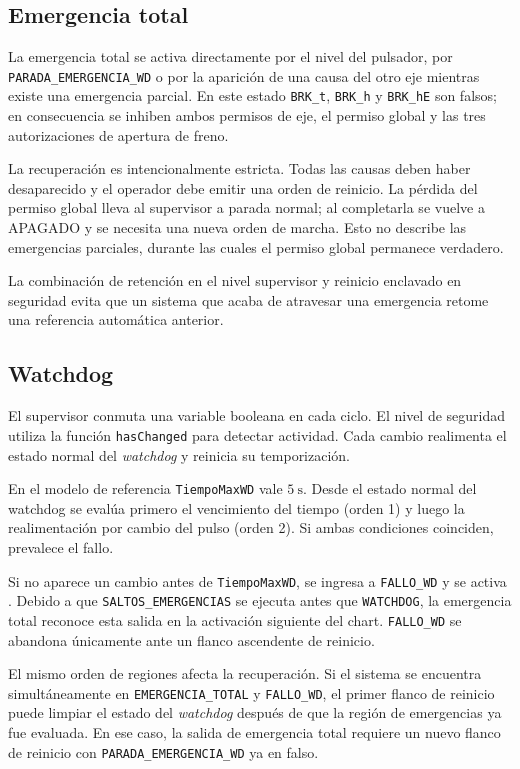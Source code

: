 \documentclass[a4paper,10pt,onecolumn,journal]{ieeeconf}
\numberwithin{equation}{section}
\begin{document}
\subsection{Emergencia total}
La emergencia total se activa directamente por el nivel del pulsador, por \texttt{PARADA\_EMERGENCIA\_WD} o por la aparición de una causa del otro eje mientras existe una emergencia parcial. En este estado \texttt{BRK\_t}, \texttt{BRK\_h} y \texttt{BRK\_hE} son falsos; en consecuencia se inhiben ambos permisos de eje, el permiso global y las tres autorizaciones de apertura de freno.

La recuperación es intencionalmente estricta. Todas las causas deben haber desaparecido y el operador debe emitir una orden de reinicio. La pérdida del permiso global lleva al supervisor a parada normal; al completarla se vuelve a APAGADO y se necesita una nueva orden de marcha. Esto no describe las emergencias parciales, durante las cuales el permiso global permanece verdadero.

La combinación de retención en el nivel supervisor y reinicio enclavado en seguridad evita que un sistema que acaba de atravesar una emergencia retome una referencia automática anterior.


\subsection{Watchdog}
El supervisor conmuta una variable booleana en cada ciclo. El nivel de seguridad utiliza la función \texttt{hasChanged} para detectar actividad. Cada cambio realimenta el estado normal del \textit{watchdog} y reinicia su temporización.

En el modelo de referencia \texttt{TiempoMaxWD} vale $5~\mathrm{s}$. Desde el estado normal del watchdog se evalúa primero el vencimiento del tiempo (orden 1) y luego la realimentación por cambio del pulso (orden 2). Si ambas condiciones coinciden, prevalece el fallo.

Si no aparece un cambio antes de \texttt{TiempoMaxWD}, se ingresa a \texttt{FALLO\_WD} y se activa . Debido a que \texttt{SALTOS\_EMERGENCIAS} se ejecuta antes que \texttt{WATCHDOG}, la emergencia total reconoce esta salida en la activación siguiente del chart. \texttt{FALLO\_WD} se abandona únicamente ante un flanco ascendente de reinicio.

El mismo orden de regiones afecta la recuperación. Si el sistema se encuentra simultáneamente en \texttt{EMERGENCIA\_TOTAL} y \texttt{FALLO\_WD}, el primer flanco de reinicio puede limpiar el estado del \textit{watchdog} después de que la región de emergencias ya fue evaluada. En ese caso, la salida de emergencia total requiere un nuevo flanco de reinicio con \texttt{PARADA\_EMERGENCIA\_WD} ya en falso.
\end{document}
